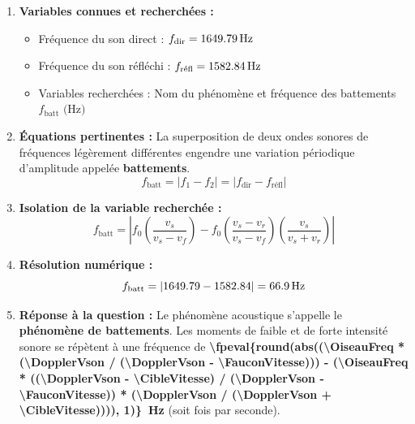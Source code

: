 \begin{enumerate}[label=\arabic*)]
    \item \textbf{Variables connues et recherchées :}
    \begin{itemize}[label=$\bullet$]
        \item Fréquence du son direct : $f_{\text{dir}} = \qty{\fpeval{round(\OiseauFreq * (\DopplerVson / (\DopplerVson - \FauconVitesse)), 2)}}{Hz}$
        \item Fréquence du son réfléchi : $f_{\text{réfl}} = \qty{\fpeval{round(\OiseauFreq * ((\DopplerVson - \CibleVitesse) / (\DopplerVson - \FauconVitesse)) * (\DopplerVson / (\DopplerVson + \CibleVitesse)), 2)}}{Hz}$
        \item Variables recherchées : Nom du phénomène et fréquence des battements $f_{\text{batt}} \text{ (Hz)}$
    \end{itemize}

    \item \textbf{Équations pertinentes :}
    La superposition de deux ondes sonores de fréquences légèrement différentes engendre une variation périodique d'amplitude appelée \textbf{battements}.
    \[
    f_{\text{batt}} = |f_1 - f_2| = |f_{\text{dir}} - f_{\text{réfl}}|
    \]

    \item \textbf{Isolation de la variable recherchée :}
    \[
    f_{\text{batt}} = \left| f_0 \left( \frac{v_s}{v_s - v_f} \right) - f_0 \left( \frac{v_s - v_r}{v_s - v_f} \right) \left( \frac{v_s}{v_s + v_r} \right) \right|
    \]

    \item \textbf{Résolution numérique :}
    \[
    f_{\text{batt}} = \left| \fpeval{round(\OiseauFreq * (\DopplerVson / (\DopplerVson - \FauconVitesse)), 2)} - \fpeval{round(\OiseauFreq * ((\DopplerVson - \CibleVitesse) / (\DopplerVson - \FauconVitesse)) * (\DopplerVson / (\DopplerVson + \CibleVitesse)), 2)} \right| = \qty{\fpeval{round(abs((\OiseauFreq * (\DopplerVson / (\DopplerVson - \FauconVitesse))) - (\OiseauFreq * ((\DopplerVson - \CibleVitesse) / (\DopplerVson - \FauconVitesse)) * (\DopplerVson / (\DopplerVson + \CibleVitesse)))), 1)}}{Hz}
    \]

    \item \textbf{Réponse à la question :}
    Le phénomène acoustique s'appelle le \textbf{phénomène de battements}. Les moments de faible et de forte intensité sonore se répètent à une fréquence de \textbf{\qty{\fpeval{round(abs((\OiseauFreq * (\DopplerVson / (\DopplerVson - \FauconVitesse))) - (\OiseauFreq * ((\DopplerVson - \CibleVitesse) / (\DopplerVson - \FauconVitesse)) * (\DopplerVson / (\DopplerVson + \CibleVitesse)))), 1)}}{Hz}} (soit  fois par seconde).
\end{enumerate}